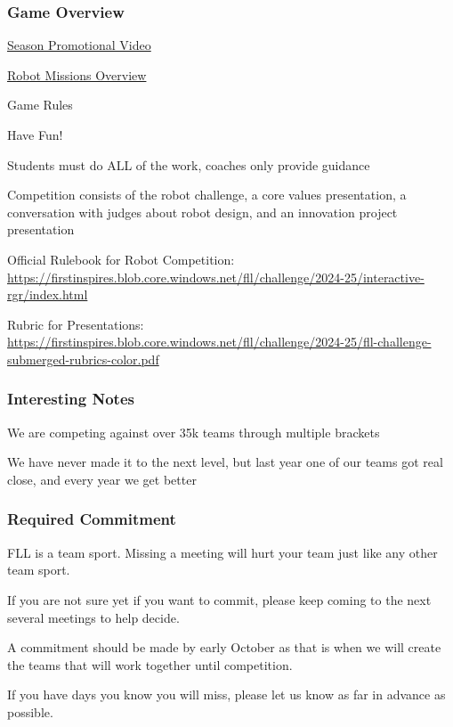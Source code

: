 \documentclass[letter]{article}
\begin{document}
\hypertarget{game-overview}{%
\subsubsection{Game Overview}\label{game-overview}}

\href{https://youtu.be/c2f-Q5GGt2Q}{Season Promotional Video}

\href{https://youtu.be/J5u-2q_K3O0}{Robot Missions Overview}

Game Rules

Have Fun!

Students must do ALL of the work, coaches only provide guidance

Competition consists of the robot challenge, a core values presentation,
a conversation with judges about robot design, and an innovation project
presentation

Official Rulebook for Robot Competition:
\url{https://firstinspires.blob.core.windows.net/fll/challenge/2024-25/interactive-rgr/index.html}

Rubric for Presentations:
\url{https://firstinspires.blob.core.windows.net/fll/challenge/2024-25/fll-challenge-submerged-rubrics-color.pdf}

\hypertarget{interesting-notes}{%
\subsubsection{Interesting Notes}\label{interesting-notes}}

We are competing against over 35k teams through multiple brackets

We have never made it to the next level, but last year one of our teams
got real close, and every year we get better

\hypertarget{required-commitment}{%
\subsubsection{Required Commitment}\label{required-commitment}}

FLL is a team sport. Missing a meeting will hurt your team just like any
other team sport.

If you are not sure yet if you want to commit, please keep coming to the
next several meetings to help decide.

A commitment should be made by early October as that is when we will
create the teams that will work together until competition.

If you have days you know you will miss, please let us know as far in
advance as possible.
\end{document}

